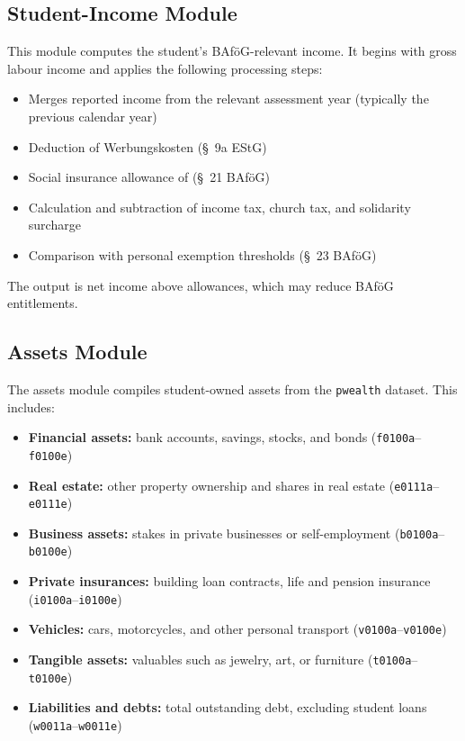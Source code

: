 \subsection{Student-Income Module}

This module computes the student's BAföG-relevant income. It begins with gross labour income and applies the following processing steps:

\begin{itemize}
  \item Merges reported income from the relevant assessment year (typically the previous calendar year)
  \item Deduction of Werbungskosten (§~9a EStG)
  \item Social insurance allowance of (§~21 BAföG)
  \item Calculation and subtraction of income tax, church tax, and solidarity surcharge
  \item Comparison with personal exemption thresholds (§~23 BAföG)
\end{itemize}

The output is net income above allowances, which may reduce BAföG entitlements.

\subsection{Assets Module}

The assets module compiles student-owned assets from the \texttt{pwealth} dataset. This includes:

\begin{itemize}
  \item \textbf{Financial assets:} bank accounts, savings, stocks, and bonds (\texttt{f0100a}--\texttt{f0100e})
  \item \textbf{Real estate:} other property ownership and shares in real estate (\texttt{e0111a}--\texttt{e0111e})
  \item \textbf{Business assets:} stakes in private businesses or self-employment (\texttt{b0100a}--\texttt{b0100e})
  \item \textbf{Private insurances:} building loan contracts, life and pension insurance (\texttt{i0100a}--\texttt{i0100e})
  \item \textbf{Vehicles:} cars, motorcycles, and other personal transport (\texttt{v0100a}--\texttt{v0100e})
  \item \textbf{Tangible assets:} valuables such as jewelry, art, or furniture (\texttt{t0100a}--\texttt{t0100e})
  \item \textbf{Liabilities and debts:} total outstanding debt, excluding student loans (\texttt{w0011a}--\texttt{w0011e})
\end{itemize}

